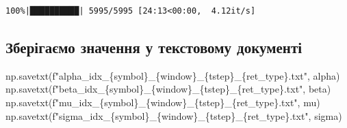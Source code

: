 \documentclass[
  letterpaper,
]{report}
\newenvironment{Shaded}{\begin{snugshade}}{\end{snugshade}}
\newcommand{\NormalTok}[1]{\textcolor[rgb]{0.00,0.23,0.31}{#1}}
\newcommand{\SpecialCharTok}[1]{\textcolor[rgb]{0.37,0.37,0.37}{#1}}
\newcommand{\SpecialStringTok}[1]{\textcolor[rgb]{0.13,0.47,0.30}{#1}}
\begin{document}
\begin{verbatim}
100%|██████████| 5995/5995 [24:13<00:00,  4.12it/s]
\end{verbatim}

\hypertarget{ux437ux431ux435ux440ux456ux433ux430ux454ux43cux43e-ux437ux43dux430ux447ux435ux43dux43dux44f-ux443-ux442ux435ux43aux441ux442ux43eux432ux43eux43cux443-ux434ux43eux43aux443ux43cux435ux43dux442ux456}{%
\subsection{Зберігаємо значення у текстовому
документі}\label{ux437ux431ux435ux440ux456ux433ux430ux454ux43cux43e-ux437ux43dux430ux447ux435ux43dux43dux44f-ux443-ux442ux435ux43aux441ux442ux43eux432ux43eux43cux443-ux434ux43eux43aux443ux43cux435ux43dux442ux456}}

\begin{Shaded}
\begin{Highlighting}[]
\NormalTok{np.savetxt(}\SpecialStringTok{f"alpha\_idx\_}\SpecialCharTok{\{}\NormalTok{symbol}\SpecialCharTok{\}}\SpecialStringTok{\_}\SpecialCharTok{\{}\NormalTok{window}\SpecialCharTok{\}}\SpecialStringTok{\_}\SpecialCharTok{\{}\NormalTok{tstep}\SpecialCharTok{\}}\SpecialStringTok{\_}\SpecialCharTok{\{}\NormalTok{ret\_type}\SpecialCharTok{\}}\SpecialStringTok{.txt"}\NormalTok{, alpha)}
\NormalTok{np.savetxt(}\SpecialStringTok{f"beta\_idx\_}\SpecialCharTok{\{}\NormalTok{symbol}\SpecialCharTok{\}}\SpecialStringTok{\_}\SpecialCharTok{\{}\NormalTok{window}\SpecialCharTok{\}}\SpecialStringTok{\_}\SpecialCharTok{\{}\NormalTok{tstep}\SpecialCharTok{\}}\SpecialStringTok{\_}\SpecialCharTok{\{}\NormalTok{ret\_type}\SpecialCharTok{\}}\SpecialStringTok{.txt"}\NormalTok{, beta)}
\NormalTok{np.savetxt(}\SpecialStringTok{f"mu\_idx\_}\SpecialCharTok{\{}\NormalTok{symbol}\SpecialCharTok{\}}\SpecialStringTok{\_}\SpecialCharTok{\{}\NormalTok{window}\SpecialCharTok{\}}\SpecialStringTok{\_}\SpecialCharTok{\{}\NormalTok{tstep}\SpecialCharTok{\}}\SpecialStringTok{\_}\SpecialCharTok{\{}\NormalTok{ret\_type}\SpecialCharTok{\}}\SpecialStringTok{.txt"}\NormalTok{, mu)}
\NormalTok{np.savetxt(}\SpecialStringTok{f"sigma\_idx\_}\SpecialCharTok{\{}\NormalTok{symbol}\SpecialCharTok{\}}\SpecialStringTok{\_}\SpecialCharTok{\{}\NormalTok{window}\SpecialCharTok{\}}\SpecialStringTok{\_}\SpecialCharTok{\{}\NormalTok{tstep}\SpecialCharTok{\}}\SpecialStringTok{\_}\SpecialCharTok{\{}\NormalTok{ret\_type}\SpecialCharTok{\}}\SpecialStringTok{.txt"}\NormalTok{, sigma)}
\end{Highlighting}
\end{Shaded}
\end{document}
